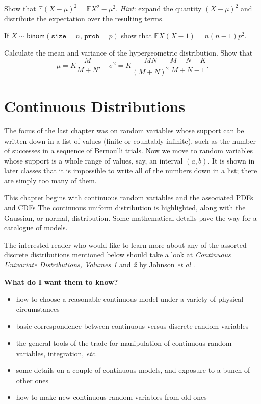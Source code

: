 \documentclass[captions=tableheading]{scrbook}
\begin{document}
\begin{xca}
Show that \(\mathbb{E}(X-\mu)^{2}=\mathbb{E} X^{2}-\mu^{2}\). \emph{Hint}: expand the quantity \((X-\mu)^{2}\) and distribute the expectation over the resulting terms.
\end{xca}

\begin{xca}
If \(X\sim\mathsf{binom}(\mathtt{size}=n,\,\mathtt{prob}=p)\) show that \(\mathbb{E} X(X-1)=n(n-1)p^{2}\).
\end{xca}

\begin{xca}
Calculate the mean and variance of the hypergeometric distribution. Show that 
\begin{equation}
\mu=K\frac{M}{M+N},\quad \sigma^{2}=K\frac{MN}{(M+N)^{2}}\frac{M+N-K}{M+N-1}.
\end{equation}
\end{xca}
\chapter{Continuous Distributions}
\label{sec-6}
\label{cha-Continuous-Distributions}


\noindent 
The focus of the last chapter was on random variables whose support can be written down in a list of values (finite or countably infinite), such as the number of successes in a sequence of Bernoulli trials. Now we move to random variables whose support is a whole range of values, say, an interval \((a,b)\). It is shown in later classes that it is impossible to write all of the numbers down in a list; there are simply too many of them.

This chapter begins with continuous random variables and the associated PDFs and CDFs The continuous uniform distribution is highlighted, along with the Gaussian, or normal, distribution. Some mathematical details pave the way for a catalogue of models.

The interested reader who would like to learn more about any of the assorted discrete distributions mentioned below should take a look at \emph{Continuous Univariate Distributions, Volumes 1} and \emph{2} by Johnson \emph{et al} \cite{Johnson1994,Johnson1995}.

\textbf{What do I want them to know?}
\begin{itemize}
\item how to choose a reasonable continuous model under a variety of physical circumstances
\item basic correspondence between continuous versus discrete random variables
\item the general tools of the trade for manipulation of continuous random variables, integration, \emph{etc}.
\item some details on a couple of continuous models, and exposure to a bunch of other ones
\item how to make new continuous random variables from old ones
\end{itemize}
\end{document}
